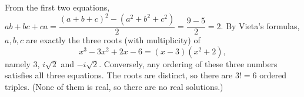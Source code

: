 From the first two equations, \(ab+bc+ca=\dfrac{(a+b+c)^2-(a^2+b^2+c^2)}{2}=\dfrac{9-5}{2}=2\). By Vieta's formulas, \(a,b,c\) are exactly the three roots (with multiplicity) of
\[
x^3-3x^2+2x-6=(x-3)(x^2+2),
\]
namely \(3\), \(i\sqrt2\) and \(-i\sqrt2\). Conversely, any ordering of these three numbers satisfies all three equations. The roots are distinct, so there are \(3!=\boxed{6}\) ordered triples. (None of them is real, so there are no real solutions.)
